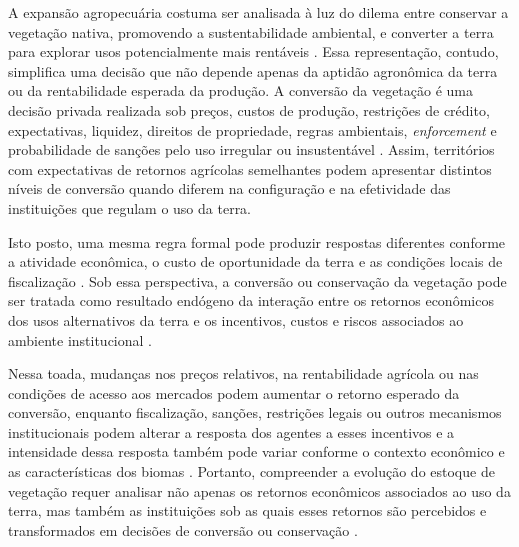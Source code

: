 A expansão agropecuária costuma ser analisada à luz do dilema entre conservar a vegetação nativa, promovendo a sustentabilidade ambiental, e converter a terra para explorar usos potencialmente mais rentáveis \cite{Angelsen2010}. Essa representação, contudo, simplifica uma decisão que não depende apenas da aptidão agronômica da terra ou da rentabilidade esperada da produção. A conversão da vegetação é uma decisão privada realizada sob preços, custos de produção, restrições de crédito, expectativas, liquidez, direitos de propriedade, regras ambientais, \textit{enforcement} e probabilidade de sanções pelo uso irregular ou insustentável \cite{LubowskiEtAl2008,JungEtAl2022}. Assim, territórios com expectativas de retornos agrícolas semelhantes podem apresentar distintos níveis de conversão quando diferem na configuração e na efetividade das instituições que regulam o uso da terra. %

\begin{sloppypar}
Isto posto, uma mesma regra formal pode produzir respostas diferentes conforme a atividade econômica, o custo de oportunidade da terra e as condições locais de fiscalização \cite{ViallonEtAl2019,AssuncaoEtAl2023}. Sob essa perspectiva, a conversão ou conservação da vegetação pode ser tratada como resultado endógeno da interação entre os retornos econômicos dos usos alternativos da terra e os incentivos, custos e riscos associados ao ambiente institucional \cite{Braganca2018,PachecoMeyer2022}. %
\end{sloppypar}

Nessa toada, mudanças nos preços relativos, na rentabilidade agrícola ou nas condições de acesso aos mercados podem aumentar o retorno esperado da conversão, enquanto fiscalização, sanções, restrições legais ou outros mecanismos institucionais podem alterar a resposta dos agentes a esses incentivos e a intensidade dessa resposta também pode variar conforme o contexto econômico e as características dos biomas \cite{HardingEtAl2021,ChomitzThomas2003}. Portanto, compreender a evolução do estoque de vegetação requer analisar não apenas os retornos econômicos associados ao uso da terra, mas também as instituições sob as quais esses retornos são percebidos e transformados em decisões de conversão ou conservação \cite{Angelsen2010,AnderssonEtAl2014}. %

